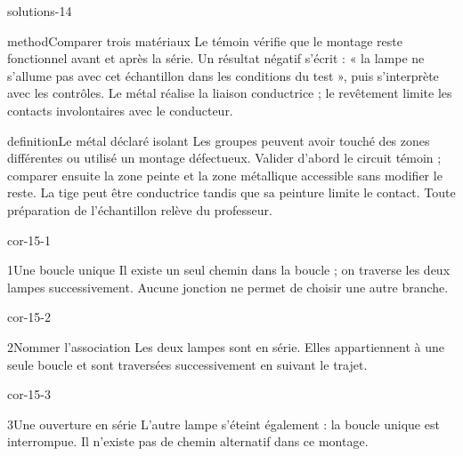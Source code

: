 \documentclass[12pt,twoside,openany]{book}
\begin{document}
\begin{pcFiche}{solutions-14}
\begin{pcEncadre}{method}{Comparer trois matériaux}
Le témoin vérifie que le montage reste fonctionnel avant et après la série. Un résultat négatif s’écrit : « la lampe ne s’allume pas avec cet échantillon dans les conditions du test », puis s’interprète avec les contrôles. Le métal réalise la liaison conductrice ; le revêtement limite les contacts involontaires avec le conducteur.\par
\end{pcEncadre}
\label{defi-cor-14}
\begin{pcEncadre}{definition}{Le métal déclaré isolant}
Les groupes peuvent avoir touché des zones différentes ou utilisé un montage défectueux. Valider d’abord le circuit témoin ; comparer ensuite la zone peinte et la zone métallique accessible sans modifier le reste. La tige peut être conductrice tandis que sa peinture limite le contact. Toute préparation de l’échantillon relève du professeur.\par
\end{pcEncadre}
\end{pcFiche}
\clearpage{}
\begin{blocLivre}{cor-15-1}
\begin{corrige}{1}{Une boucle unique}
Il existe un seul chemin dans la boucle ; on traverse les deux lampes successivement. Aucune jonction ne permet de choisir une autre branche.\par
\end{corrige}\end{blocLivre}
\begin{blocLivre}{cor-15-2}
\begin{corrige}{2}{Nommer l’association}
Les deux lampes sont en série. Elles appartiennent à une seule boucle et sont traversées successivement en suivant le trajet.\par
{}
\end{corrige}\end{blocLivre}
\begin{blocLivre}{cor-15-3}
\begin{corrige}{3}{Une ouverture en série}
L’autre lampe s’éteint également : la boucle unique est interrompue. Il n’existe pas de chemin alternatif dans ce montage.\par
{}
\end{corrige}\end{blocLivre}
\end{document}

